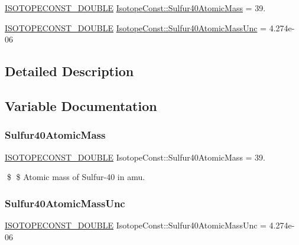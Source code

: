 \begin{DoxyCompactItemize}
\item 
\mbox{\hyperlink{group___isotope_const-_macros_ga8f45a7272ce02c0b4c65c44636ed719a}{I\+S\+O\+T\+O\+P\+E\+C\+O\+N\+S\+T\+\_\+\+D\+O\+U\+B\+LE}} \mbox{\hyperlink{group___isotope_const-_sulfur-_s40_ga33ffcb26e4bd93e4209d7a6a3b2e42e4}{Isotope\+Const\+::\+Sulfur40\+Atomic\+Mass}} = 39.
\item 
\mbox{\hyperlink{group___isotope_const-_macros_ga8f45a7272ce02c0b4c65c44636ed719a}{I\+S\+O\+T\+O\+P\+E\+C\+O\+N\+S\+T\+\_\+\+D\+O\+U\+B\+LE}} \mbox{\hyperlink{group___isotope_const-_sulfur-_s40_ga09496906eb781be78d861f54342423de}{Isotope\+Const\+::\+Sulfur40\+Atomic\+Mass\+Unc}} = 4.\+274e-\/06
\end{DoxyCompactItemize}


\subsection{Detailed Description}


\subsection{Variable Documentation}
\mbox{\label{group___isotope_const-_sulfur-_s40_ga33ffcb26e4bd93e4209d7a6a3b2e42e4}} 
\subsubsection{\texorpdfstring{Sulfur40\+Atomic\+Mass}{Sulfur40AtomicMass}}
{\footnotesize\ttfamily \mbox{\hyperlink{group___isotope_const-_macros_ga8f45a7272ce02c0b4c65c44636ed719a}{I\+S\+O\+T\+O\+P\+E\+C\+O\+N\+S\+T\+\_\+\+D\+O\+U\+B\+LE}} Isotope\+Const\+::\+Sulfur40\+Atomic\+Mass = 39.}

\$ \$ Atomic mass of Sulfur-\/40 in amu. \mbox{\label{group___isotope_const-_sulfur-_s40_ga09496906eb781be78d861f54342423de}} 
\subsubsection{\texorpdfstring{Sulfur40\+Atomic\+Mass\+Unc}{Sulfur40AtomicMassUnc}}
{\footnotesize\ttfamily \mbox{\hyperlink{group___isotope_const-_macros_ga8f45a7272ce02c0b4c65c44636ed719a}{I\+S\+O\+T\+O\+P\+E\+C\+O\+N\+S\+T\+\_\+\+D\+O\+U\+B\+LE}} Isotope\+Const\+::\+Sulfur40\+Atomic\+Mass\+Unc = 4.\+274e-\/06}

